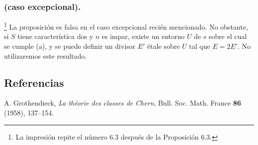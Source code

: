 \subsubsection*{ (caso excepcional).}
\footnote{La impresión repite el número 6.3 después de la Proposición
6.3.}
La proposición es falsa en el caso excepcional recién mencionado.
No obstante, si $S$ tiene característica dos y $n$ es impar, existe
un entorno $U$ de $s$ sobre el cual se cumple (a), y se puede definir
un divisor $E'$ étale sobre $U$ tal que $E=2E'$. No utilizaremos este
resultado.

\subsection*{Referencias}

\noindent[1] A. Grothendieck, \emph{La théorie des classes de Chern},
Bull. Soc. Math. France \textbf{86} (1958), 137--154.
